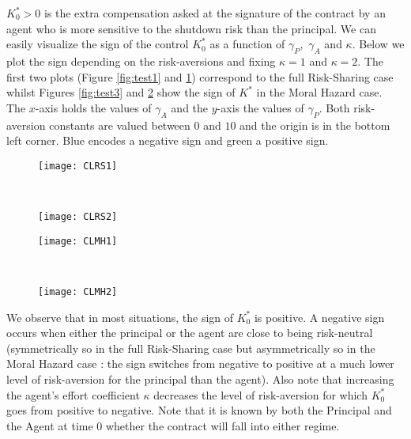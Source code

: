 \documentclass[numbook, envcountsect, envcountsame, envcountreset, runningheads, smallextended]{article}
\begin{document}
$K_0^*>0$ is the extra compensation asked at the signature of the contract by an agent who is more sensitive to the shutdown risk than the principal.
 We can easily visualize the sign of the control $K^*_0$ as a function of $\gamma_P,$ $\gamma_A$ and $\kappa$. Below we plot the sign  depending on the risk-aversions and fixing $\kappa=1$ and $\kappa=2$. The first two plots (Figure \ref{fig:test1} and \ref{fig:test2}) correspond to the full Risk-Sharing case whilst Figures \ref{fig:test3} and \ref{fig:test4} show the sign of $K^*$ in the Moral Hazard case. The $x$-axis holds the values of $\gamma_A$ and the $y$-axis the values of $\gamma_P$. Both risk-aversion constants are valued between $0$ and $10$ and the origin is in the bottom left corner. Blue encodes a negative sign and green a positive sign.

\begin{figure}[h!]
\centering
\begin{minipage}{0.33\textwidth}
  \centering
  \texttt{[image: CLRS1]}
  \label{fig:test1}
\end{minipage}%
~
~
\begin{minipage}{0.33\textwidth}
  \centering
  \texttt{[image: CLRS2]}
    \label{fig:test2}
\end{minipage}
\end{figure}

\begin{figure}[htb!]
\centering
\begin{minipage}{0.33\textwidth}
  \centering
  \texttt{[image: CLMH1]}
  \label{fig:test3}
\end{minipage}%
~
~
\begin{minipage}{0.33\textwidth}
  \centering
  \texttt{[image: CLMH2]}
   \label{fig:test4}
\end{minipage}
\end{figure}

We observe that in most situations, the sign of $K^*_0$ is positive. A negative sign occurs when either the principal or the agent are close to being risk-neutral (symmetrically so in the full Risk-Sharing case but asymmetrically so in the Moral Hazard case : the sign switches from negative to positive at a much lower level of risk-aversion for the principal than the agent). Also note that increasing the agent's effort coefficient $\kappa$ decreases the level of risk-aversion for which $K^*_0$ goes from positive to negative. 
Note that it is known by both the Principal and the Agent at time $0$ whether the contract will fall into either regime.\\
\end{document}
